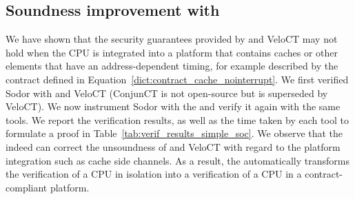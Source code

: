 \subsection{Soundness improvement with \PICI}
\label{subsec:pici_platform}

We have shown that the security guarantees provided by \ucfi and VeloCT may not hold when the CPU is integrated into a platform that contains caches or other elements that have an address-dependent timing, for example described by the contract defined in Equation~\ref{dict:contract_cache_nointerrupt}.
We first verified Sodor with \ucfi and VeloCT (ConjunCT is not open-source but is superseded by VeloCT).
We now instrument Sodor with the \PICI and verify it again with the same tools.
We report the verification results, as well as the time taken by each tool to formulate a proof in Table~\ref{tab:verif_results_simple_soc}.
We observe that the \PICI indeed can correct the unsoundness of \ucfi and VeloCT with regard to the platform integration such as cache side channels.
As a result, the \PICI automatically transforms the verification of a CPU in isolation into a verification of a CPU in a contract-compliant platform.


